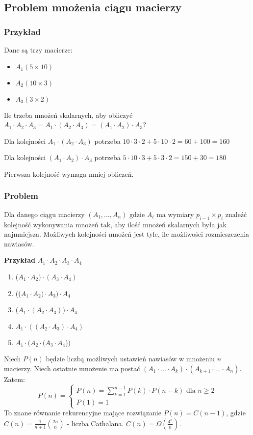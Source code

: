\subsection{Problem mnożenia ciągu macierzy}
\subsubsection{Przykład}
Dane są trzy macierze:
\begin{itemize}
\item $ A_1 (5 \times 10) $
\item $ A_2 (10 \times 3) $
\item $ A_3 (3 \times 2) $
\end{itemize}

Ile trzeba mnożeń skalarnych, aby obliczyć $A_1 \cdot A_2 \cdot A_3 = A_1 \cdot (A_2 \cdot A_3) = (A_1 \cdot A_2) \cdot A_3$?

Dla kolejności $A_1 \cdot (A_2 \cdot A_3)$ potrzeba $10 \cdot 3 \cdot 2 + 5 \cdot  10 \cdot 2 = 60 + 100 = 160$

Dla kolejności $(A_1 \cdot A_2) \cdot A_3$ potrzeba $5 \cdot 10 \cdot 3 + 5 \cdot 3 \cdot 2 = 150 + 30 = 180$

Pierwsza kolejność wymaga mniej obliczeń.

\subsubsection{Problem}
Dla danego ciągu macierzy $(A_1, ...,  A_n)$ gdzie $A_i$ ma wymiary $p_{i-1} \times p_i$ znaleźć kolejność wykonywania mnożeń tak, aby ilość mnożeń skalarnych była jak najmniejsza. 
Możliwych kolejności mnożeń jest tyle, ile możliwości rozmieszczenia nawiasów.

\textbf{Przykład} $A_1 \cdot A_2 \cdot A_3 \cdot A_4$
\begin{enumerate}
\item ($A_1 \cdot A_2) \cdot (A_3 \cdot A_4)$
\item (($A_1 \cdot A_2) \cdot A_3) \cdot A_4$
\item ($A_1 \cdot (A_2 \cdot A_3)) \cdot A_4$
\item $A_1 \cdot ((A_2 \cdot A_3) \cdot A_4)$
\item $A_1 \cdot (A_2 \cdot (A_3 \cdot A_4$))
\end{enumerate}

Niech $P(n)$ będzie liczbą możliwych ustawień nawiasów w mnożeniu $n$ macierzy. Niech ostatnie mnożenie ma postać $(A_1 \cdot ... \cdot A_k) \cdot (A_{k+1} \cdot ... \cdot A_n)$. Zatem:
$$
P(n) = 	\begin{cases}
		P(n) = \sum_{k=1}^{n-1} P(k) \cdot P(n-k) \text{ dla } n \geq 2 \\
		P(1) = 1
		\end{cases}
$$
To znane równanie rekurencyjne mające rozwiązanie $P(n) = C(n-1)$, gdzie $C(n) = \frac{1}{n+1}\binom{2n}{n}$ - liczba Cathalana. $C(n) = \Omega(\frac{4^n}{n})$.

